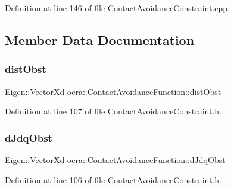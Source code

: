 Definition at line 146 of file Contact\+Avoidance\+Constraint.\+cpp.



\subsection{Member Data Documentation}
\hypertarget{classocra_1_1ContactAvoidanceFunction_aa3d1b5f23d42c0936b1fa09ad7988732}{}\label{classocra_1_1ContactAvoidanceFunction_aa3d1b5f23d42c0936b1fa09ad7988732} 
\subsubsection{\texorpdfstring{dist\+Obst}{distObst}}
{\footnotesize\ttfamily Eigen\+::\+Vector\+Xd ocra\+::\+Contact\+Avoidance\+Function\+::dist\+Obst\hspace{0.3cm}{\ttfamily [protected]}}



Definition at line 107 of file Contact\+Avoidance\+Constraint.\+h.

\hypertarget{classocra_1_1ContactAvoidanceFunction_a59c655299c8db310d3e06a47729f0780}{}\label{classocra_1_1ContactAvoidanceFunction_a59c655299c8db310d3e06a47729f0780} 
\subsubsection{\texorpdfstring{d\+Jdq\+Obst}{dJdqObst}}
{\footnotesize\ttfamily Eigen\+::\+Vector\+Xd ocra\+::\+Contact\+Avoidance\+Function\+::d\+Jdq\+Obst\hspace{0.3cm}{\ttfamily [protected]}}



Definition at line 106 of file Contact\+Avoidance\+Constraint.\+h.

\hypertarget{classocra_1_1ContactAvoidanceFunction_a49e94dae2d7708e66cf11e737b1a4d6d}{}\label{classocra_1_1ContactAvoidanceFunction_a49e94dae2d7708e66cf11e737b1a4d6d} 
